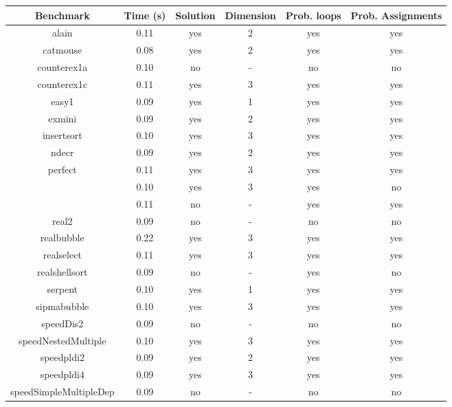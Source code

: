\begin{center}
\begin{table}[]
  \centering
   \begin{tabular}{c|c|c|c|c|c}
    
{Benchmark} & {Time (s)} & {Solution} & {Dimension} & {Prob. loops} & {Prob. Assignments} \\\hline \hline
{alain} & {0.11} & {yes} & {2} & {yes} & {yes} \\\hline
{catmouse} & {0.08} & {yes} & {2} & {yes} & {yes} \\\hline
{counterex1a} & {0.10} & {no} & {-} & {no} & {no} \\\hline
{counterex1c} & {0.11} & {yes} & {3} & {yes} & {yes} \\\hline
{easy1} & {0.09} & {yes} & {1} & {yes} & {yes} \\\hline
{exmini} & {0.09} & {yes} & {2} & {yes} & {yes} \\\hline
{insertsort} & {0.10} & {yes} & {3} & {yes} & {yes} \\\hline
{ndecr} & {0.09} & {yes} & {2} & {yes} & {yes} \\\hline
{perfect} & {0.11} & {yes} & {3} & {yes} & {yes} \\\hline
{\multirow{2}{*}{perfect2}} & {0.10} & {yes} & {3} & {yes} & {no} \\\cline{2-6}
{} & {0.11} & {no} & {-} & {yes} & {yes} \\\hline
{real2} & {0.09} & {no} & {-} & {no} & {no} \\\hline
{realbubble} & {0.22} & {yes} & {3} & {yes} & {yes} \\\hline
{realselect} & {0.11} & {yes} & {3} & {yes} & {yes} \\\hline
{realshellsort} & {0.09} & {no} & {-} & {yes} & {no} \\\hline
{serpent} & {0.10} & {yes} & {1} & {yes} & {yes} \\\hline
{sipmabubble} & {0.10} & {yes} & {3} & {yes} & {yes} \\\hline
{speedDis2} & {0.09} & {no} & {-} & {no} & {no} \\\hline
{speedNestedMultiple} & {0.10} & {yes} & {3} & {yes} & {yes} \\\hline
{speedpldi2} & {0.09} & {yes} & {2} & {yes} & {yes} \\\hline
{speedpldi4} & {0.09} & {yes} & {3} & {yes} & {yes} \\\hline
{speedSimpleMultipleDep} & {0.09} & {no} & {-} & {no} & {no} \\\hline

\end{tabular}
\end{table}
\end{center}
